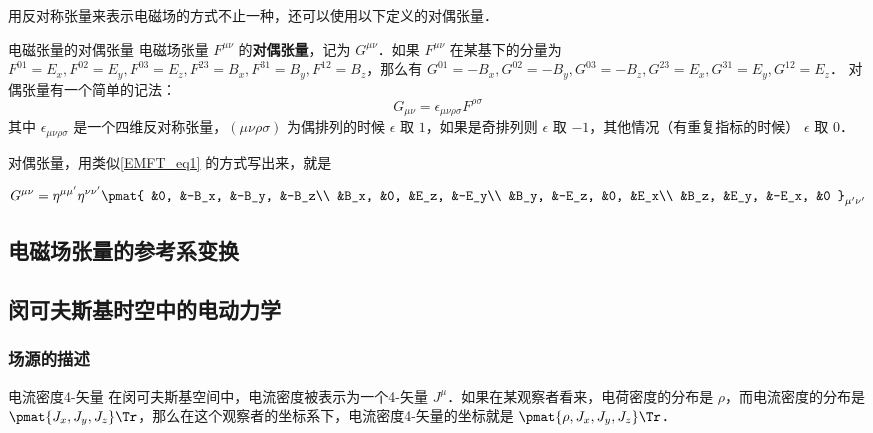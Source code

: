 用反对称张量来表示电磁场的方式不止一种，还可以使用以下定义的对偶张量．

\begin{definition}{电磁张量的对偶张量}
电磁场张量 $F^{\mu\nu}$ 的\textbf{对偶张量}，记为 $G^{\mu\nu}$．如果 $F^{\mu\nu}$ 在某基下的分量为 $F^{01}=E_x, F^{02}=E_y, F^{03}=E_z, F^{23}=B_x, F^{31}=B_y, F^{12}=B_z$，那么有 $G^{01}=-B_x, G^{02}=-B_y, G^{03}=-B_z, G^{23}=E_x, G^{31}=E_y, G^{12}=E_z$．
对偶张量有一个简单的记法：
\begin{equation}
G_{\mu\nu}=\epsilon_{\mu\nu\rho\sigma}F^{\rho\sigma}
\end{equation}
其中 $\epsilon_{\mu\nu\rho\sigma}$ 是一个四维反对称张量，$(\mu\nu\rho\sigma)$ 为偶排列的时候 $\epsilon$ 取 $1$，如果是奇排列则 $\epsilon$ 取 $-1$，其他情况（有重复指标的时候） $\epsilon$ 取 $0$．
\end{definition}

对偶张量，用类似\autoref{EMFT_eq1} 的方式写出来，就是

\begin{equation}
\begin{aligned}
G^{\mu\nu}=\eta^{\mu\mu'}\eta^{\nu\nu'}
\pmat{
&0, &-B_x, &-B_y, &-B_z\\ 
&B_x, &0, &E_z, &-E_y\\ 
&B_y, &-E_z, &0, &E_x\\
&B_z, &E_y, &-E_x, &0
}_{\mu'\nu'}
\end{aligned}
\end{equation}

\subsection{电磁场张量的参考系变换}


\subsection{闵可夫斯基时空中的电动力学}

\subsubsection{场源的描述}

\begin{definition}{电流密度4-矢量}
在闵可夫斯基空间中，电流密度被表示为一个4-矢量 $J^\mu$．如果在某观察者看来，电荷密度的分布是 $\rho$，而电流密度的分布是 $\pmat{J_x, J_y, J_z}\Tr$，那么在这个观察者的坐标系下，电流密度4-矢量的坐标就是 $\pmat{\rho, J_x, J_y, J_z}\Tr$．
\end{definition}

